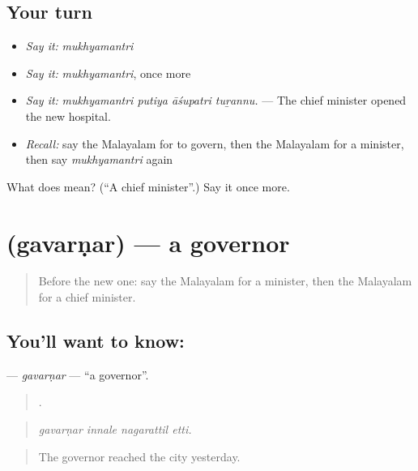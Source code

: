 \subsection*{Your turn}
\begin{itemize}
\raggedright
  \item \emph{Say it:} \emph{mukhyamantri}
  \item \emph{Say it:} \emph{mukhyamantri}, once more
  \item \emph{Say it:} \emph{mukhyamantri putiya āśupatri tuṟannu.} — The chief minister opened the new hospital.
  \item \emph{Recall:} say the Malayalam for to govern, then the Malayalam for a minister, then say \emph{mukhyamantri} again
\end{itemize}

\begin{tcolorbox}[breakable,colback=teal!4,colframe=teal!35!black,title={Before you move on}]
What does  mean? (\textquotedblleft{}A chief minister\textquotedblright{}.) Say it once more.
\end{tcolorbox}
\section[\texorpdfstring{\ml{ഗവർണർ} (gavarṇar)}{ഗവർണർ (gavarṇar)}]{ (gavarṇar) — a governor}

\label{lesson:ML-C421-gavarnar}



\begin{quote}
Before the new one: say the Malayalam for a minister, then the Malayalam for a chief minister.
\end{quote}

\subsection*{You'll want to know: }
\textbf{} — \emph{gavarṇar} — \textquotedblleft{}a governor\textquotedblright{}.

\begin{quote}
   .
\end{quote}

\begin{quote}
\emph{gavarṇar innale nagarattil etti.}
\end{quote}

\begin{quote}
The governor reached the city yesterday.
\end{quote}

